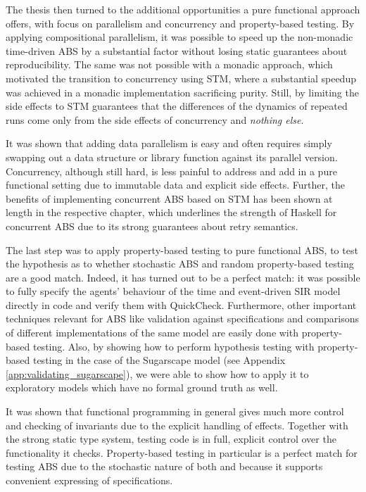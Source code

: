 \medskip

The thesis then turned to the additional opportunities a pure functional approach offers, with focus on parallelism and concurrency and property-based testing. By applying compositional parallelism, it was possible to speed up the non-monadic time-driven ABS by a substantial factor without losing static guarantees about reproducibility. The same was not possible with a monadic approach, which motivated the transition to concurrency using STM, where a substantial speedup was achieved in a monadic implementation sacrificing purity. Still, by limiting the side effects to STM guarantees that the differences of the dynamics of repeated runs come only from the side effects of concurrency and \textit{nothing else}. 

It was shown that adding data parallelism is easy and often requires simply swapping out a data structure or library function against its parallel version. Concurrency, although still hard, is less painful to address and add in a pure functional setting due to immutable data and explicit side effects. Further, the benefits of implementing concurrent ABS based on STM has been shown at length in the respective chapter, which underlines the strength of Haskell for concurrent ABS due to its strong guarantees about retry semantics.

\medskip

The last step was to apply property-based testing to pure functional ABS, to test the hypothesis as to whether stochastic ABS and random property-based testing are a good match. Indeed, it has turned out to be a perfect match: it was possible to fully specify the agents' behaviour of the time and event-driven SIR model directly in code and verify them with QuickCheck. Furthermore, other important techniques relevant for ABS like validation against specifications and comparisons of different implementations of the same model are easily done with property-based testing. Also, by showing how to perform hypothesis testing with property-based testing in the case of the Sugarscape model (see Appendix \ref{app:validating_sugarscape}), we were able to show how to apply it to exploratory models which have no formal ground truth as well.

It was shown that functional programming in general gives much more control and checking of invariants due to the explicit handling of effects. Together with the strong static type system, testing code is in full, explicit control over the functionality it checks. Property-based testing in particular is a perfect match for testing ABS due to the stochastic nature of both and because it supports convenient expressing of specifications. %

